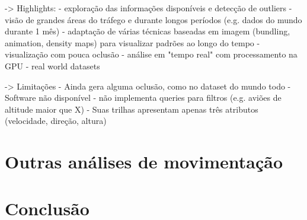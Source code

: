 -> Highlights:
  - exploração das informações disponíveis e detecção de outliers
  - visão de grandes áreas do tráfego e durante longos períodos (e.g. dados do mundo durante 1 mês)
  - adaptação de várias técnicas baseadas em imagem (bundling, animation, density maps) para visualizar
  padrões ao longo do tempo
  - visualização com pouca oclusão
  - análise em "tempo real" com processamento na GPU
  - real world datasets

-> Limitações
  - Ainda gera alguma oclusão, como no dataset do mundo todo
  - Software não disponível
  - não implementa queries para filtros (e.g. aviões de altitude maior que X)
  - Suas trilhas apresentam apenas três atributos (velocidade, direção, altura)

\section{Outras análises de movimentação}

\section{Conclusão}





